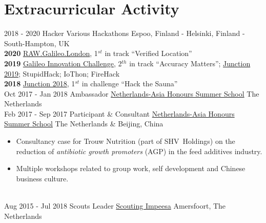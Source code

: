 \documentclass[a4paper]{twentysecondcv} %
\begin{document}
\section{Extracurricular Activity}
%
\begin{twenty} %
	\twentyitem
	{2018 -}
	{2020}
	{Hacker}
	{Various Hackathons}
	{Espoo, Finland - Helsinki, Finland - South-Hampton, UK}
	{
	\\
	\textbf{2020} 
	\href{https://raw.galileo.london/}{RAW.Galileo.London}, 1$^{st}$ in track ``Verified Location''
	\\
    \textbf{2019} 
    \href{https://ultrahack.org/galileoinnovationchallenge}{Galileo Innovation Challenge}, 2$^{th}$ in track ``Accuracy Matters'';
    \href{http://hackjunction.com/}{Junction 2019};
    StupidHack;
    IoThon;
    FireHack
    \\
    \textbf{2018} 
    \href{https://hackjunction.com}{Junction 2018}, 1$^{st}$ in challenge ``Hack the Sauna''
	}
	\\
	\twentyitem
	{Oct 2017 -}
	{Jan 2018}
	{Ambassador}
	{\href{https://nahss.nl/en}{Netherlands-Asia Honours Summer School}}
	{The Netherlands}
	{}
	\\
	\twentyitem
	{Feb 2017 -}
	{Sep 2017}
	{Participant \& Consultant}
	{\href{https://nahss.nl/en}{Netherlands-Asia Honours Summer School}}
	{The Netherlands \& Beijing, China}
	{
		\begin{itemize}
			\item Consultancy case for Trouw Nutrition (part of SHV~Holdings) on the reduction of \emph{antibiotic growth promoters} (AGP) in the feed additives industry.
			\item Multiple workshops related to group work, self development and Chinese business culture.
		\end{itemize}
	}
	\\
	\twentyitem
	{Aug 2015 -}
	{Jul 2018}
	{Scouts Leader}
	{\href{https://www.impeesa.nl/}{Scouting Impeesa}}
	{Amersfoort, The Netherlands}
	{}
	\\
\end{twenty}
\end{document}
